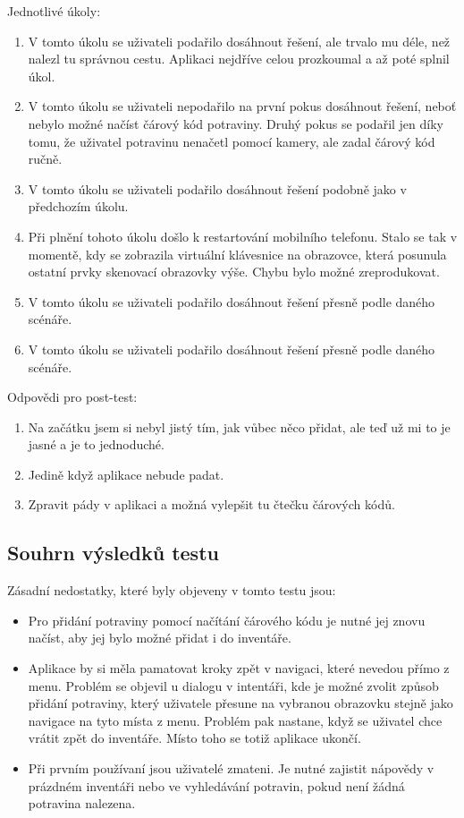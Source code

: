 \documentclass[thesis=B,czech]{FITthesis}[2013/10/20]
\begin{document}
Jednotlivé úkoly:
\begin{enumerate}
  \item V tomto úkolu se uživateli podařilo dosáhnout řešení, ale trvalo mu déle, než nalezl tu správnou cestu. Aplikaci nejdříve celou prozkoumal a až poté splnil úkol.
  \item V tomto úkolu se uživateli nepodařilo na první pokus dosáhnout řešení, neboť nebylo možné načíst čárový kód potraviny. Druhý pokus se podařil jen díky tomu, že uživatel potravinu nenačetl pomocí kamery, ale zadal čárový kód ručně.
  \item V tomto úkolu se uživateli podařilo dosáhnout řešení podobně jako v předchozím úkolu.
  \item Při plnění tohoto úkolu došlo k restartování mobilního telefonu. Stalo se tak v momentě, kdy se zobrazila virtuální klávesnice na obrazovce, která posunula ostatní prvky skenovací obrazovky výše. Chybu bylo možné zreprodukovat.
  \item V tomto úkolu se uživateli podařilo dosáhnout řešení přesně podle daného scénáře.
  \item V tomto úkolu se uživateli podařilo dosáhnout řešení přesně podle daného scénáře.
\end{enumerate}


Odpovědi pro post-test:
\begin{enumerate}
  \item Na začátku jsem si nebyl jistý tím, jak vůbec něco přidat, ale teď už mi to je jasné a je to jednoduché.
  \item Jedině když aplikace nebude padat.
  \item Zpravit pády v aplikaci a možná vylepšit tu čtečku čárových kódů.
\end{enumerate}

\subsection{Souhrn výsledků testu}

Zásadní nedostatky, které byly objeveny v tomto testu jsou:
\begin{itemize}
	\item{Pro přidání potraviny pomocí načítání čárového kódu je nutné jej znovu načíst, aby jej bylo možné přidat i do inventáře.}
	\item{Aplikace by si měla pamatovat kroky zpět v navigaci, které nevedou přímo z menu. Problém se objevil u dialogu v intentáři, kde je možné zvolit způsob přidání potraviny, který uživatele přesune na vybranou obrazovku stejně jako navigace na tyto místa z menu. Problém pak nastane, když se uživatel chce vrátit zpět do inventáře. Místo toho se totiž aplikace ukončí.}
	\item{Při prvním používaní jsou uživatelé zmateni. Je nutné zajistit nápovědy v prázdném inventáři nebo ve vyhledávání potravin, pokud není žádná potravina nalezena.}
\end{itemize}
\end{document}
